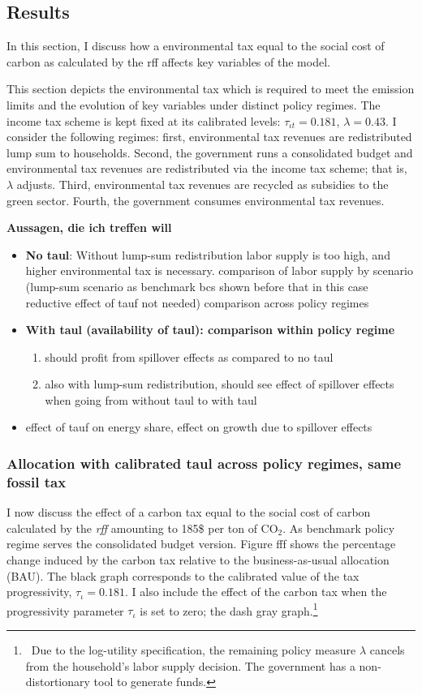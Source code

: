 \subsection{Results }
In this section, I discuss how a environmental tax equal to the social cost of carbon as calculated by the rff affects key variables of the model. 


This section depicts the environmental tax which is required to meet the emission limits and the evolution of key variables under distinct policy regimes. The income tax scheme is kept fixed at its calibrated levels: $\tau_{\iota t}=0.181$, $\lambda=0.43$.
I consider the following regimes: first, environmental tax revenues are redistributed lump sum to households. Second, the government runs a consolidated budget and environmental tax revenues are redistributed via the income tax scheme; that is, $\lambda$ adjusts. Third, environmental tax revenues are recycled as subsidies to the green sector. Fourth, the government consumes environmental tax revenues. 

\textbf{Aussagen, die ich treffen will}
\begin{itemize}
	\item \textbf{No taul}:  Without lump-sum redistribution labor supply is too high, and higher environmental tax is necessary.  comparison of labor supply by scenario (lump-sum scenario as benchmark bcs shown before that in this case reductive effect of tauf not needed)
	\ar comparison across policy regimes
	\item \textbf{With taul (availability of taul): comparison within policy regime}
	\begin{enumerate}
	\item should profit from spillover effects as compared to no taul
 	\item 
	also with lump-sum redistribution, should see effect of spillover effects when going from without taul to with taul	
	\end{enumerate}
	\item effect of tauf on energy share, effect on growth due to spillover effects
\end{itemize}


\subsubsection{Allocation with calibrated taul across policy regimes, same fossil tax}

I now discuss the effect of a carbon tax equal to the social cost of carbon calculated by the \textit{rff} amounting to 185\$ per ton of CO$_2$. As benchmark policy regime serves the consolidated budget version. 
Figure fff shows the percentage change induced by the carbon tax relative to the business-as-usual allocation (BAU). The black graph corresponds to the calibrated value of the tax progressivity, $\tau_{\iota}=0.181$. I also include the effect of the carbon tax when the progressivity parameter $\tau_\iota$ is set to zero; the dash gray graph.\footnote{\ Due to the log-utility specification, the remaining policy measure $\lambda$ cancels from the household's labor supply decision. The government has a non-distortionary tool to generate funds.} 

